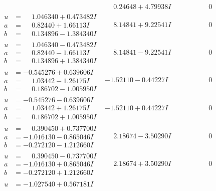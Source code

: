 \documentclass[1p]{elsarticle_modified}
\theoremstyle{definition}
\begin{document}
$$\begin{array}{c|c|c}
 & \phantom{-}0.24648 + 4.79938 I & \phantom{-0.000000 } 0 \\ \hline\begin{aligned}
u &= \phantom{-}1.046340 + 0.473482 I \\
a &= \phantom{-}0.82440 + 1.66113 I \\
b &= \phantom{-}0.134896 - 1.384340 I\end{aligned}
 & \phantom{-}8.14841 + 9.22541 I & \phantom{-0.000000 } 0 \\ \hline\begin{aligned}
u &= \phantom{-}1.046340 - 0.473482 I \\
a &= \phantom{-}0.82440 - 1.66113 I \\
b &= \phantom{-}0.134896 + 1.384340 I\end{aligned}
 & \phantom{-}8.14841 - 9.22541 I & \phantom{-0.000000 } 0 \\ \hline\begin{aligned}
u &= -0.545276 + 0.639606 I \\
a &= \phantom{-}1.03442 - 1.26175 I \\
b &= \phantom{-}0.186702 - 1.005950 I\end{aligned}
 & -1.52110 - 0.44227 I & \phantom{-0.000000 } 0 \\ \hline\begin{aligned}
u &= -0.545276 - 0.639606 I \\
a &= \phantom{-}1.03442 + 1.26175 I \\
b &= \phantom{-}0.186702 + 1.005950 I\end{aligned}
 & -1.52110 + 0.44227 I & \phantom{-0.000000 } 0 \\ \hline\begin{aligned}
u &= \phantom{-}0.390450 + 0.737700 I \\
a &= -1.016130 - 0.865046 I \\
b &= -0.272120 - 1.212660 I\end{aligned}
 & \phantom{-}2.18674 - 3.50290 I & \phantom{-0.000000 } 0 \\ \hline\begin{aligned}
u &= \phantom{-}0.390450 - 0.737700 I \\
a &= -1.016130 + 0.865046 I \\
b &= -0.272120 + 1.212660 I\end{aligned}
 & \phantom{-}2.18674 + 3.50290 I & \phantom{-0.000000 } 0 \\ \hline\begin{aligned}
u &= -1.027540 + 0.567181 I \\

\end{aligned}
\end{array}$$
\end{document}
